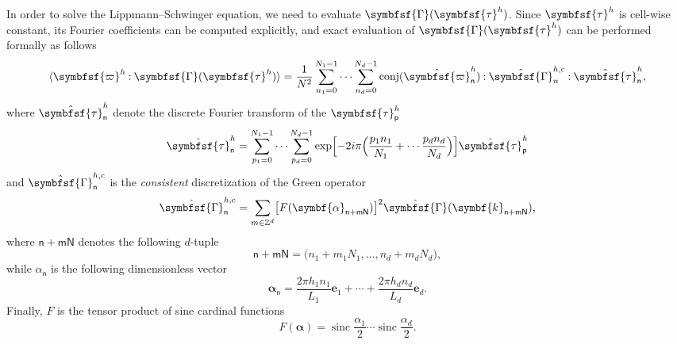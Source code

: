 \documentclass[draft, appendixprefix=true, chapterprefix=true, fontsize=12pt, numbers=noendperiod]{scrbook}
\DeclareMathOperator{\conj}{conj}
\newcommand{\dbldot}{\mathbin{\mathord{:}}}
\newcommand{\integers}{\mathbb{Z}}
\newcommand{\tens}[1]{\symbfsf{#1}}
\renewcommand{\vec}[1]{\symbf{#1}}
\DeclareMathOperator{\sinc}{sinc}
\newcommand{\tuple}[1]{\mathsf{#1}}
\begin{document}
In order to solve the Lippmann--Schwinger equation, we
need to evaluate \(\tens\Gamma(\tens\tau^h)\). Since \(\tens\tau^h\) is
cell-wise constant, its Fourier coefficients can be computed explicitly, and
exact evaluation of \(\tens\Gamma(\tens\tau^h)\) can be performed formally
\parencite{bris2010a,bris2012a} as follows
\begin{equation}
  \label{eq:20202118112132}
  \langle\tens\varpi^h\dbldot\tens\Gamma(\tens\tau^h)\rangle=\frac1{N^2}
  \sum_{n_1=0}^{N_1-1}\cdots\sum_{n_d=0}^{N_d-1}\conj(\hat{\tens\varpi}_
  {\tuple{n}}^h)\dbldot\hat{\tens\Gamma}_n^{h, \mathrm{c}}\dbldot
  \hat{\tens\tau}_{\tuple{n}}^h,
\end{equation}
where \(\hat{\tens\tau}_{\tuple{n}}^h\) denote the discrete Fourier transform
of the \(\tens\tau_{\tuple{p}}^h\)
\begin{equation}
  \hat{\tens\tau}_{\tuple{n}}^h=\sum_{p_1=0}^{N_1-1}\cdots\sum_{p_d=0}^{N_d-1}\exp\Bigl[
  -2i\pi\Bigl(\frac{p_1n_1}{N_1}+\cdots\frac{p_dn_d}{N_d}\Bigr)\Bigr]
  \hat{\tens\tau}_{\tuple{p}}^h
\end{equation}
and \(\hat{\tens\Gamma}_{\tuple{n}}^{h, \mathrm{c}}\) is the \emph{consistent}
discretization of the Green operator
\begin{equation}
  \label{eq:20202218112204}
  \hat{\tens\Gamma}_{\tuple{n}}^{h, \mathrm{c}}=\sum_{m\in\integers^d}\bigl[F(\vec
  \alpha_{\tuple{n+mN}})\bigr]^2\hat{\tens\Gamma}(\vec k_{\tuple{n+mN}}),
\end{equation}
where \(\tuple{n+mN}\) denotes the following \(d\)-tuple
\begin{equation}
  \tuple{n+mN}=\bigl(n_1+m_1N_1, \ldots, n_d+m_dN_d\bigr),
\end{equation}
while \(\alpha_{\tuple{n}}\) is the following dimensionless vector
\begin{equation}
  \vec\alpha_{\tuple{n}}=\frac{2\pi h_1n_1}{L_1}\vec e_1+\cdots+\frac{2\pi h_dn_d}{L_d}\vec e_d.
\end{equation}
Finally, \(F\) is the tensor product of sine cardinal functions
\begin{equation}
  F(\vec\alpha)=\sinc\frac{\alpha_1}2\cdots\sinc\frac{\alpha_d}2.
\end{equation}
\end{document}
